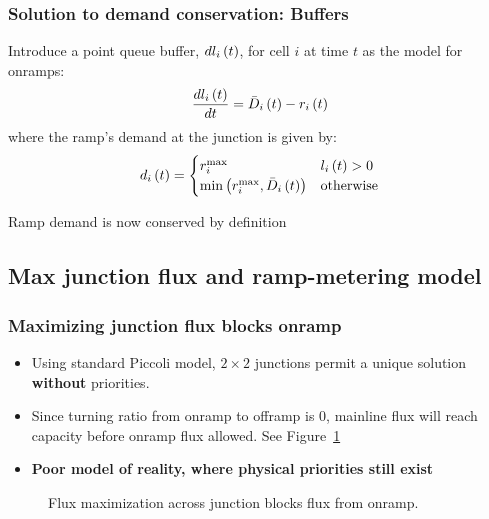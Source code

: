 \begin{frame}

\frametitle{Solution to demand conservation: Buffers}
Introduce a point queue buffer, $dl_{i}\left(t\right)$, for cell $i$ at time $t$ as the model for onramps:
\begin{equation}
\frac{dl_{i}\left(t\right)}{dt} = \bar{D}_{i}\left(t\right)- r_{i}\left( t \right) \label{eq:rampode} 
\end{equation}
where the ramp's demand at the junction is given by:
\begin{equation}
d_{i}\left(t\right) = \begin{cases}
r_{i}^{\max} & l_{i}\left(t\right)>0\\
\min \left( r_{i}^{\max} , \bar{D}_{i}\left(t\right) \right) & \text{otherwise}
\end{cases}
\end{equation}

\begin{fact}
Ramp demand is now conserved by definition
\end{fact}

\end{frame}


\subsection{Max junction flux and ramp-metering model}
\begin{frame}

	\frametitle{Maximizing junction flux blocks onramp}
	\begin{itemize}
		\item<1-> Using standard Piccoli model, $2 \times 2$ junctions permit a unique solution \textbf{without} priorities.
		\item<2-> Since turning ratio from onramp to offramp is $0$, mainline flux will reach capacity before onramp flux allowed. See Figure~\ref{fig:bad2by2}
		\item<3-> \textbf{Poor model of reality, where physical priorities still exist}
	\end{itemize}

 \begin{figure}[ht]
	\centering
	{
	\resizebox{.5 \columnwidth}{!}{
	}
	\caption{Flux maximization across junction blocks flux from onramp.}
	\label{fig:bad2by2}}
 \end{figure}

\end{frame}

